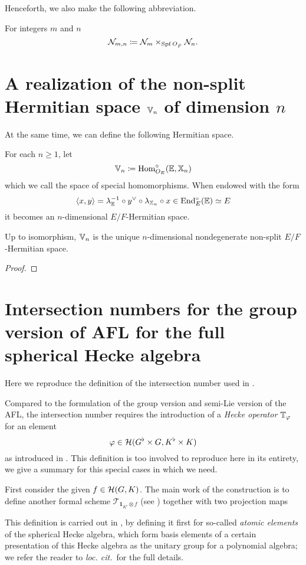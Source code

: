 Henceforth, we also make the following abbreviation.
\begin{definition}
  For integers $m$ and $n$
  \[ \mathcal N_{m,n} \coloneq \mathcal N_{m} \times_{\operatorname{Spf} O_{\breve F}} \mathcal N_n. \]
\end{definition}

\section{A realization of the non-split Hermitian space $\mathbb V_n$ of dimension $n$}
At the same time, we can define the following Hermitian space.
\begin{definition}
  For each $n \ge 1$, let
  \[ \mathbb V_n \coloneqq \operatorname{Hom}_{O_E}^\circ (\mathbb E, \mathbb X_n) \]
  which we call the space of special homomorphisms.
  When endowed with the form
  \[ \left< x,y \right> = \lambda_{\mathbb E}^{-1} \circ y^\vee \circ \lambda_{\mathbb X_n} \circ x
    \in \operatorname{End}_{E}^\circ(\mathbb E) \simeq E \]
  it becomes an $n$-dimensional $E/F$-Hermitian space.
\end{definition}
\begin{proposition}
  Up to isomorphism, $\mathbb V_n$ is the unique $n$-dimensional
  nondegenerate non-split $E/F$-Hermitian space.
\end{proposition}
\begin{proof}
\end{proof}

\section{Intersection numbers for the group version of AFL for the full spherical Hecke algebra}
Here we reproduce the definition of the intersection number used in .

Compared to the formulation of the group version and semi-Lie version of the AFL,
the intersection number requires the introduction of a
\emph{Hecke operator} $\mathbb T_{\varphi}$ for an element
\[ \varphi \in \mathcal H(G^\flat \times G, K^\flat \times K) \]
as introduced in \cite{ref:AFLspherical}.
This definition is too involved to reproduce here in its entirety,
we give a summary for this special cases in which we need.

First consider the given $f \in \mathcal H(G, K)$.
The main work of the construction is to define another
formal scheme $\mathcal{T}_{\mathbf{1}_{K^\flat} \otimes f}$ (see \cite[\S6.1]{ref:AFLspherical})
together with two projection maps
\begin{center}
\end{center}
This definition is carried out in \cite[\S5]{ref:AFLspherical},
by defining it first for so-called \emph{atomic elements} of the spherical Hecke algebra,
which form basis elements of a certain presentation of this Hecke algebra
as the unitary group for a polynomial algebra;
we refer the reader to \emph{loc. cit.}~for the full details.

